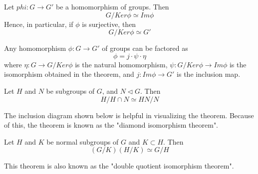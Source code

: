 \begin{teo}
    Let $phi:G\rightarrow G'$ be a homomorphism of groups. Then
    \begin{equation*}
        G/Ker\phi \simeq Im \phi
    \end{equation*}
    Hence, in particular, if $\phi$ is surjective, then 
    \begin{equation*}
        G/Ker \phi \simeq G'
    \end{equation*}
\end{teo}
\begin{coro}
Any homomorphism $\phi:G\rightarrow G'$ of groups can be factored as 
\begin{equation*}
    \phi=j\cdot\psi\cdot\eta
\end{equation*}
where $\eta:G\rightarrow G/Ker\phi$ is the natural homomorphism, $\psi:G/Ker\phi\rightarrow Im\phi$ is the isomorphism obtained in the theorem, and $j:Im\phi\rightarrow G'$ is the inclusion map.
\begin{center}
\end{center}
\end{coro}
\begin{teo}
    Let $H$ and $N$ be subgroups of $G$, and $N\vartriangleleft G$. Then
    \begin{equation*}
        H/H\cap N \simeq HN/N
    \end{equation*}
\end{teo}
The inclusion diagram shown below is helpful in visualizing the theorem. Because of this, the theorem is known as the "diamond isomorphism theorem".
\begin{center}
\end{center}
\begin{teo}
    Let $H$ and $K$ be normal subgroups of $G$ and $K\subset H$. Then
    \begin{equation*}
        (G/K)(H/K)\simeq G/H
    \end{equation*}
\end{teo}
This theorem is also known as the "double quotient isomorphism theorem".
